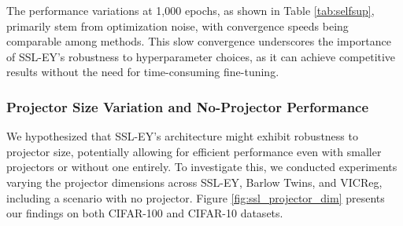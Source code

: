 The performance variations at 1,000 epochs, as shown in Table \ref{tab:selfsup}, primarily stem from optimization noise, with convergence speeds being comparable among methods. This slow convergence underscores the importance of SSL-EY's robustness to hyperparameter choices, as it can achieve competitive results without the need for time-consuming fine-tuning.

\subsubsection{Projector Size Variation and No-Projector Performance}
We hypothesized that SSL-EY's architecture might exhibit robustness to projector size, potentially allowing for efficient performance even with smaller projectors or without one entirely. To investigate this, we conducted experiments varying the projector dimensions across SSL-EY, Barlow Twins, and VICReg, including a scenario with no projector. Figure \ref{fig:ssl_projector_dim} presents our findings on both CIFAR-100 and CIFAR-10 datasets.

